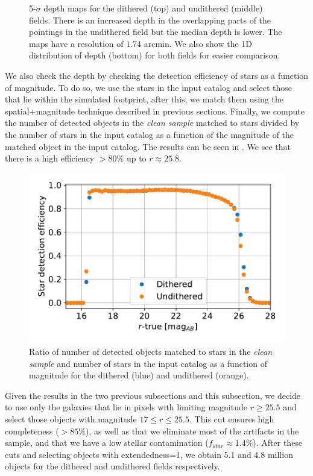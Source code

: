 \documentclass[twocolumn]{aastex62}
\begin{document}
\begin{figure}
\caption{5-$\sigma$ depth maps for the dithered (top) and undithered (middle) fields. There is an increased depth in the overlapping parts of the pointings in the undithered field but the median depth is lower. The maps have a resolution of $1.74$ arcmin. We also show the 1D distribution of depth (bottom) for both fields for easier comparison.}
\label{fig:depth_maps}
\end{figure}

We also check the depth by checking the detection efficiency of stars as a function of magnitude. To do so, we use the stars in the input catalog and select those that lie within the simulated footprint, after this, we match them using the spatial+magnitude technique described in previous sections. Finally, we compute the number of detected objects in the \textit{clean sample} matched to stars divided by the number of stars in the input catalog as a function of the magnitude of the matched object in the input catalog. The results can be seen in . We see that there is a high efficiency $> 80\%$ up to $r \approx 25.8$. 
\begin{figure}
\centering
\includegraphics[width=0.9\columnwidth]{stellar_detection_efficiency.pdf}
\caption{Ratio of number of detected objects matched to stars in the \textit{clean sample} and number of stars in the input catalog as a function of magnitude for the dithered (blue) and undithered (orange).}
\label{fig:stellar_detection_efficiency}
\end{figure}

Given the results in the two previous subsections and this subsection, we decide to use only the galaxies that lie in pixels with limiting magnitude $r \geq 25.5$ and select those objects with magnitude $17 \leq r \leq 25.5$. This cut ensures high completeness ($>85\%$), as well as that we eliminate most of the artifacts in the sample, and that we have a low stellar contamination ($f_{star} \approx 1.4\%$). After these cuts and selecting objects with extendedness=1, we obtain 5.1 and 4.8 million objects for the dithered and undithered fields respectively.
\end{document}
